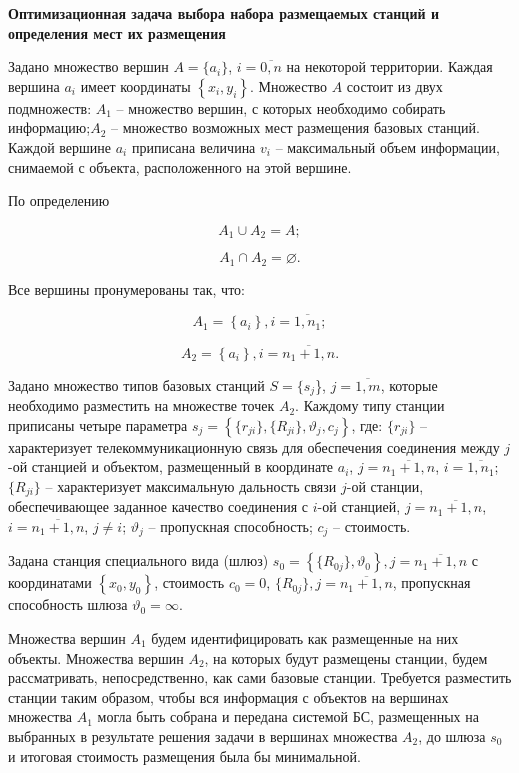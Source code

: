 \textbf{Оптимизационная задача выбора набора размещаемых станций и определения мест их размещения}

Задано множество вершин $A = \{a_i\}$, $i=\overline{0,n}$ на некоторой территории. Каждая вершина $a_i$ имеет координаты $\left\{ x_i, y_i \right\}$. Множество $A$ состоит из двух подмножеств:  $A_1$ -- множество вершин, с которых необходимо собирать информацию;$A_2$ -- множество возможных мест размещения базовых станций. Каждой вершине $a_i$ приписана   величина $v_i$ -- максимальный объем информации, снимаемой с объекта, расположенного на этой вершине.

По определению

$$
A_1 \cup A_2 = A;
$$

$$
A_1 \cap A_2 = \varnothing.
$$

Все вершины пронумерованы так, что:

$$
A_1 = \left\{a_i \right\}, i= \overline{1,n_1};
$$

$$
A_2 = \left\{ a_i  \right\}, i= \overline{n_1+1,n}.
$$


Задано множество типов базовых станций $S = \{s_j$\}, $j=\overline{1,m}$, которые необходимо разместить на множестве точек $A_2$. Каждому типу станции приписаны четыре параметра $s_j = \left\{\{r_{ji}\}, \{R_{ji}\}, \vartheta_j, c_j \right\}$, где:  $\{r_{ji}\}$ -- характеризует телекоммуникационную связь для обеспечения соединения между $j$-ой станцией и объектом, размещенный в координате $a_i$, $j= \overline{n_1+1,n}$, $i= \overline{1,n_1}$; $\{R_{ji}\}$ --  характеризует максимальную дальность связи $j$-ой станции, обеспечивающее заданное качество соединения с $i$-ой станцией, $j= \overline{n_1+1,n}$, $i= \overline{n_1+1,n}$, $j \neq i$; $\vartheta_j$ -- пропускная способность; $c_j$ -- стоимость.


Задана станция специального вида (шлюз) $s_0 = \left\{ \{R_{0j}\}, \vartheta_0 \right\}, j = \overline{n_1+1,n}$ с координатами $\left\{x_0, y_0 \right\}$, стоимость $c_0 = 0$, $\{R_{0j}\}, j = \overline{n_1+1,n}$, пропускная способность шлюза $\vartheta_0 = \infty$.


Множества вершин $A_1$ будем идентифицировать как размещенные на них объекты. Множества вершин $A_2$, на которых будут размещены станции, будем рассматривать, непосредственно, как сами базовые станции.  Требуется разместить станции таким образом, чтобы вся информация с объектов на вершинах множества $A_1$ могла быть собрана и передана системой БС, размещенных на выбранных в результате решения задачи в вершинах множества  $A_2$, до шлюза $s_0$ и итоговая стоимость размещения была бы минимальной.


